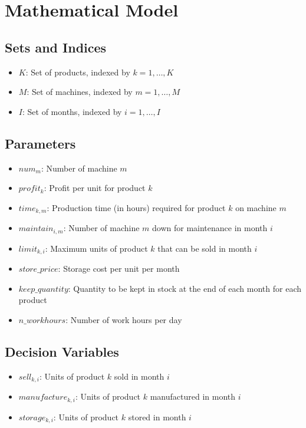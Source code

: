 \documentclass{article}
\begin{document}
\section*{Mathematical Model}

\subsection*{Sets and Indices}
\begin{itemize}
    \item $K$: Set of products, indexed by $k = 1, \dots, K$
    \item $M$: Set of machines, indexed by $m = 1, \dots, M$
    \item $I$: Set of months, indexed by $i = 1, \dots, I$
\end{itemize}

\subsection*{Parameters}
\begin{itemize}
    \item $num_{m}$: Number of machine $m$
    \item $profit_{k}$: Profit per unit for product $k$
    \item $time_{k,m}$: Production time (in hours) required for product $k$ on machine $m$
    \item $maintain_{i,m}$: Number of machine $m$ down for maintenance in month $i$
    \item $limit_{k,i}$: Maximum units of product $k$ that can be sold in month $i$
    \item $store\_price$: Storage cost per unit per month
    \item $keep\_quantity$: Quantity to be kept in stock at the end of each month for each product
    \item $n\_workhours$: Number of work hours per day
\end{itemize}

\subsection*{Decision Variables}
\begin{itemize}
    \item $sell_{k,i}$: Units of product $k$ sold in month $i$
    \item $manufacture_{k,i}$: Units of product $k$ manufactured in month $i$
    \item $storage_{k,i}$: Units of product $k$ stored in month $i$
\end{itemize}
\end{document}
